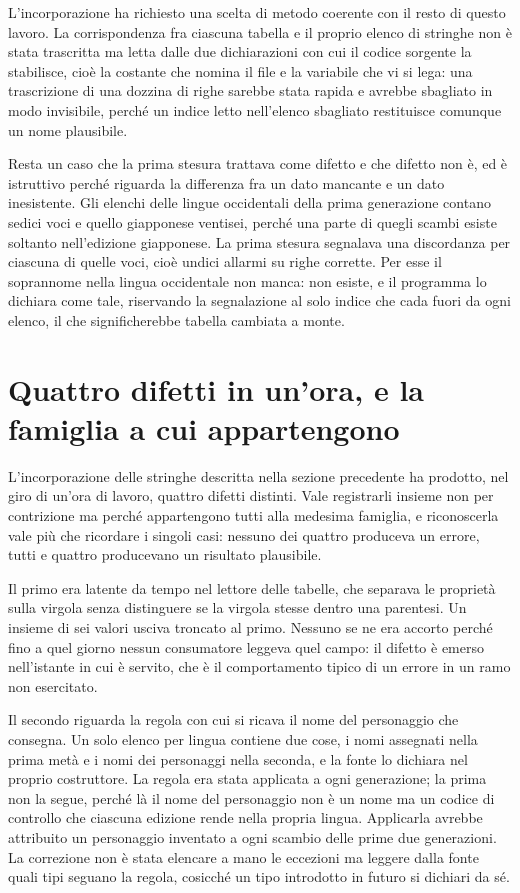 L'incorporazione ha richiesto una scelta di metodo coerente con il resto di questo lavoro. La corrispondenza fra ciascuna tabella e il proprio elenco di stringhe non è stata trascritta ma letta dalle due dichiarazioni con cui il codice sorgente la stabilisce, cioè la costante che nomina il file e la variabile che vi si lega: una trascrizione di una dozzina di righe sarebbe stata rapida e avrebbe sbagliato in modo invisibile, perché un indice letto nell'elenco sbagliato restituisce comunque un nome plausibile.

Resta un caso che la prima stesura trattava come difetto e che difetto non è, ed è istruttivo perché riguarda la differenza fra un dato mancante e un dato inesistente. Gli elenchi delle lingue occidentali della prima generazione contano sedici voci e quello giapponese ventisei, perché una parte di quegli scambi esiste soltanto nell'edizione giapponese. La prima stesura segnalava una discordanza per ciascuna di quelle voci, cioè undici allarmi su righe corrette. Per esse il soprannome nella lingua occidentale non manca: non esiste, e il programma lo dichiara come tale, riservando la segnalazione al solo indice che cada fuori da ogni elenco, il che significherebbe tabella cambiata a monte.

\section{Quattro difetti in un'ora, e la famiglia a cui appartengono}

L'incorporazione delle stringhe descritta nella sezione precedente ha prodotto, nel giro di un'ora di lavoro, quattro difetti distinti. Vale registrarli insieme non per contrizione ma perché appartengono tutti alla medesima famiglia, e riconoscerla vale più che ricordare i singoli casi: nessuno dei quattro produceva un errore, tutti e quattro producevano un risultato plausibile.

Il primo era latente da tempo nel lettore delle tabelle, che separava le proprietà sulla virgola senza distinguere se la virgola stesse dentro una parentesi. Un insieme di sei valori usciva troncato al primo. Nessuno se ne era accorto perché fino a quel giorno nessun consumatore leggeva quel campo: il difetto è emerso nell'istante in cui è servito, che è il comportamento tipico di un errore in un ramo non esercitato.

Il secondo riguarda la regola con cui si ricava il nome del personaggio che consegna. Un solo elenco per lingua contiene due cose, i nomi assegnati nella prima metà e i nomi dei personaggi nella seconda, e la fonte lo dichiara nel proprio costruttore. La regola era stata applicata a ogni generazione; la prima non la segue, perché là il nome del personaggio non è un nome ma un codice di controllo che ciascuna edizione rende nella propria lingua. Applicarla avrebbe attribuito un personaggio inventato a ogni scambio delle prime due generazioni. La correzione non è stata elencare a mano le eccezioni ma leggere dalla fonte quali tipi seguano la regola, cosicché un tipo introdotto in futuro si dichiari da sé.

